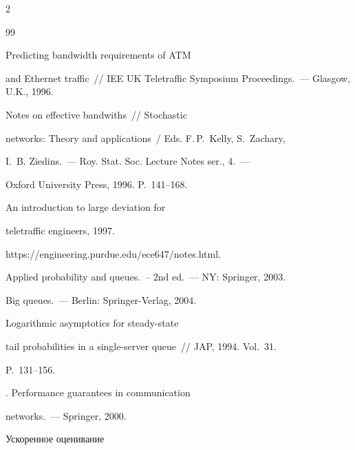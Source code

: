 \begin{multicols}{2}
{{\begin{thebibliography}{99}

Predicting bandwidth requirements of ATM

 and Ethernet traffic~// IEE UK Teletraffic Symposium Proceedings.~--- Glasgow, U.K., 1996.




 Notes on   effective bandwiths~// Stochastic

networks: Theory and applications~/ Eds. F.\,P.~Kelly, S.~Zachary, 

I.~B. Ziedins.~--- Roy. Stat. Soc. Lecture Notes ser., 4.~---

Oxford University Press, 1996. P.~141--168.






 An introduction to large deviation for

teletraffic engineers, 1997.

{\sf https://\linebreak engineering.purdue.edu/ece647/notes.html}.






  Applied probability and queues.~-- 2nd ed.~--- NY: Springer, 2003.




 Big queues.~--- Berlin:  Springer-Verlag, 2004.




 Logarithmic asymptotics for steady-state

tail probabilities in a single-server queue~// JAP, 1994. Vol.~31.

P.~131--156.




.  Performance guarantees in communication

networks.~--- Springer, 2000.






 Ускоренное оценивание


\end{thebibliography}}}
\end{multicols}
